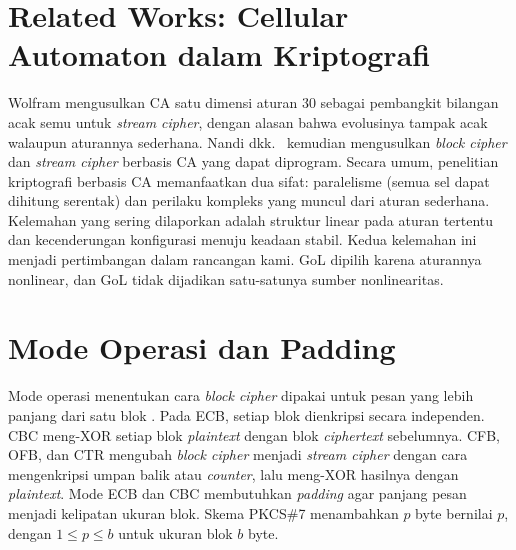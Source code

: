 \section{Related Works: Cellular Automaton dalam Kriptografi}
Wolfram \cite{wolfram1986} mengusulkan CA satu dimensi aturan 30 sebagai pembangkit bilangan acak semu untuk \textit{stream cipher}, dengan alasan bahwa evolusinya tampak acak walaupun aturannya sederhana. Nandi dkk.\ \cite{nandi1994} kemudian mengusulkan \textit{block cipher} dan \textit{stream cipher} berbasis CA yang dapat diprogram. Secara umum, penelitian kriptografi berbasis CA memanfaatkan dua sifat: paralelisme (semua sel dapat dihitung serentak) dan perilaku kompleks yang muncul dari aturan sederhana. Kelemahan yang sering dilaporkan adalah struktur linear pada aturan tertentu dan kecenderungan konfigurasi menuju keadaan stabil. Kedua kelemahan ini menjadi pertimbangan dalam rancangan kami. GoL dipilih karena aturannya nonlinear, dan GoL tidak dijadikan satu-satunya sumber nonlinearitas.

\section{Mode Operasi dan Padding}
Mode operasi menentukan cara \textit{block cipher} dipakai untuk pesan yang lebih panjang dari satu blok \cite{sp80038a}. Pada ECB, setiap blok dienkripsi secara independen. CBC meng-XOR setiap blok \textit{plaintext} dengan blok \textit{ciphertext} sebelumnya. CFB, OFB, dan CTR mengubah \textit{block cipher} menjadi \textit{stream cipher} dengan cara mengenkripsi umpan balik atau \textit{counter}, lalu meng-XOR hasilnya dengan \textit{plaintext}. Mode ECB dan CBC membutuhkan \textit{padding} agar panjang pesan menjadi kelipatan ukuran blok. Skema PKCS\#7 \cite{rfc5652} menambahkan $p$ byte bernilai $p$, dengan $1 \le p \le b$ untuk ukuran blok $b$ byte.

